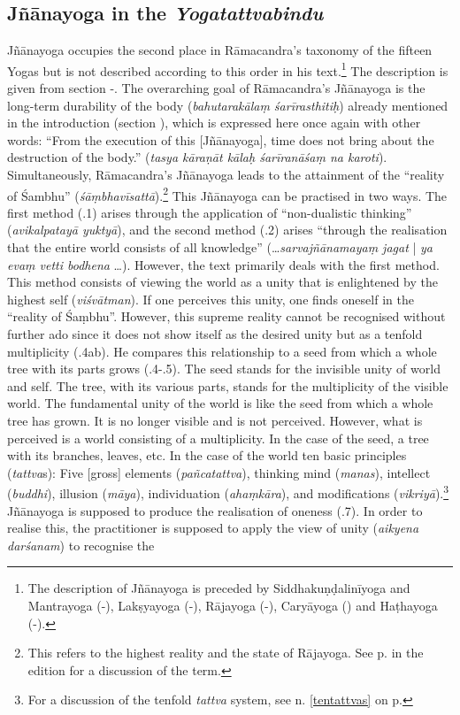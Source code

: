 \subsection{Jñānayoga in the \textit{Yogatattvabindu}}
\label{Jnanayogaintro2}
Jñānayoga occupies the second place in Rāmacandra's taxonomy of the fifteen Yogas but is not described according to this order in his text.\footnote{The description of Jñānayoga is preceded by Siddhakuṇḍalinīyoga and Mantrayoga (-), Lakṣyayoga (-), Rājayoga (-), Caryāyoga () and Haṭhayoga (-).} The description is given from section -. The overarching goal of Rāmacandra's Jñānayoga is the long-term durability of the body (\textit{bahutarakālaṃ śarīrasthitiḥ}) already mentioned in the introduction (section ), which is expressed here once again with other words: ``From the execution of this [Jñānayoga], time does not bring about the destruction of the body.'' (\textit{tasya kāraṇāt kālaḥ śarīranāśaṃ na karoti}). Simultaneously, Rāmacandra's Jñānayoga leads to the attainment of the ``reality of Śambhu'' (\textit{śāṃbhavīsattā}).\footnote{This refers to the highest reality and the state of Rājayoga. See p.\pageref{jnanayogatrans1} in the edition for a discussion of the term.} This Jñānayoga can be practised in two ways. The first method (.1) arises through the application of ``non-dualistic thinking'' (\textit{avikalpatayā yuktyā}), and the second method (.2) arises ``through the realisation that the entire world consists of all knowledge'' (\ldots \textit{sarvajñānamayaṃ jagat} | \textit{ya evaṃ vetti bodhena} \ldots). However, the text primarily deals with the first method. This method consists of viewing the world as a unity that is enlightened by the highest self (\textit{viśvātman}). If one perceives this unity, one finds oneself in the ``reality of Śaṃbhu''. However, this supreme reality cannot be recognised without further ado since it does not show itself as the desired unity but as a tenfold multiplicity (.4ab). He compares this relationship to a seed from which a whole tree with its parts grows (.4-.5). The seed stands for the invisible unity of world and self. The tree, with its various parts, stands for the multiplicity of the visible world. The fundamental unity of the world is like the seed from which a whole tree has grown. It is no longer visible and is not perceived. However, what is perceived is a world consisting of a multiplicity. In the case of the seed, a tree with its branches, leaves, etc. In the case of the world ten basic principles (\textit{tattva}s): Five [gross] elements (\textit{pañcatattva}), thinking mind (\textit{manas}), intellect (\textit{buddhi}), illusion (\textit{māya}), individuation (\textit{ahaṃkāra}), and modifications (\textit{vikriyā}).\footnote{For a discussion of the tenfold \textit{tattva} system, see n. \ref{tentattvas} on p. \pageref{tentattvas}} Jñānayoga is supposed to produce the realisation of oneness (.7). In order to realise this, the practitioner is supposed to apply the view of unity (\textit{aikyena darśanam}) to recognise the 